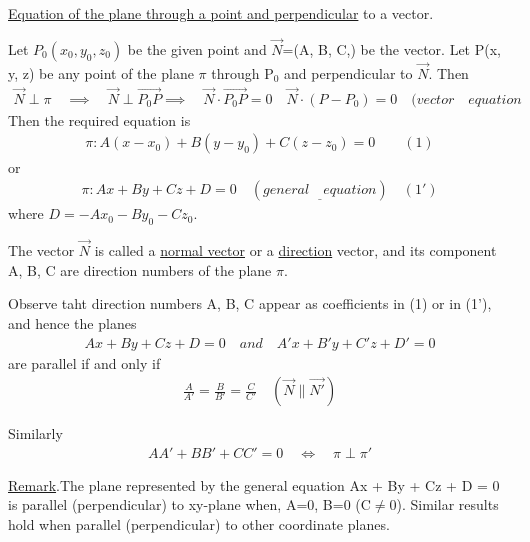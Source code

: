\documentclass{amsbook}
\begin{document}
\par\underline{Equation of the plane through a point and perpendicular} to a vector.
\par Let $P_{0}(x_{0},y_{0},z_{0})$ be the given point and $\overrightarrow{N}$=(A, B, C,) be the vector. Let P(x, y, z) be any point of the plane $\pi$ through P$_{0}$ and perpendicular to $\overrightarrow{N}$. Then
\begin{align*}
	\overrightarrow{N}\perp\pi\quad
	\implies\quad\overrightarrow{N}\perp\overrightarrow{P_{0}P}
	\implies\quad\overrightarrow{N}\cdot\overrightarrow{P_{0}P}=0\quad
	\overrightarrow{N}\cdot(P-P_{0})=0\quad\big(vector\quad equation
\end{align*}
Then the required equation is
\begin{align*}
	\pi :A(x-x_{0})+B(y-y_{0})+C(z-z_{0})=0\qquad(1)
\end{align*}
or
\begin{align*}
	\pi:Ax+By+Cz+D=0\quad(\underline{general\quad equation})\quad(1')
\end{align*}
where $D=-Ax_{0}-By_{0}-Cz_{0}$.
\par The vector $\overrightarrow{N}$ is called a \underline{normal vector} or a \underline{direction} vector, and its component A, B, C are direction numbers of the plane $\pi$.
\par Observe taht direction numbers A, B, C appear as coefficients in (1) or in (1'), and hence the planes
\begin{align*}
	Ax+By+Cz+D=0\quad and \quad A'x+B'y+C'z+D'=0
\end{align*}
are parallel if and only if
\begin{align*}
	\frac{A}{A'}=\frac{B}{B'}=\frac{C}{C'}\quad(\overrightarrow{N}\parallel\overrightarrow{N'})
\end{align*}
\par Similarly
\begin{align*}
	AA'+BB'+CC'=0\quad\iff\quad\pi\perp\pi'
\end{align*}
\par\underline{Remark}.The plane represented by the general equation Ax + By + Cz + D = 0 is parallel (perpendicular) to xy-plane when, A=0, B=0 (C$\neq$0). Similar results hold when parallel (perpendicular) to other coordinate planes.
\end{document}
